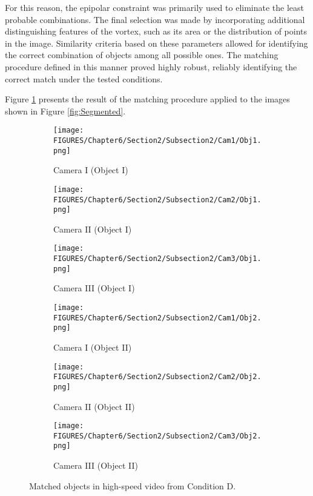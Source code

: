 For this reason, the epipolar constraint was primarily used to eliminate the least probable combinations. The final selection was made by incorporating additional distinguishing features of the vortex, such as its area or the distribution of points in the image. Similarity criteria based on these parameters allowed for identifying the correct combination of objects among all possible ones.
The matching procedure defined in this manner proved highly robust, reliably identifying the correct match under the tested conditions.

Figure \ref{fig:match} presents the result of the matching procedure applied to the images shown in Figure \ref{fig:Segmented}.

\begin{figure}[htbp]
    \centering
    \begin{subfigure}{0.32\textwidth}
        \centering
        \texttt{[image: FIGURES/Chapter6/Section2/Subsection2/Cam1/Obj1.png]}
        \caption{Camera I (Object I)}
    \end{subfigure}
    \begin{subfigure}{0.32\textwidth}
        \centering
        \texttt{[image: FIGURES/Chapter6/Section2/Subsection2/Cam2/Obj1.png]}
        \caption{Camera II (Object I)}
    \end{subfigure}
    \begin{subfigure}{0.32\textwidth}
        \centering
        \texttt{[image: FIGURES/Chapter6/Section2/Subsection2/Cam3/Obj1.png]}
        \caption{Camera III (Object I)}
    \end{subfigure}

    \medskip 
    
    \begin{subfigure}{0.32\textwidth}
        \centering
        \texttt{[image: FIGURES/Chapter6/Section2/Subsection2/Cam1/Obj2.png]}
        \caption{Camera I (Object II)}
    \end{subfigure}
    \begin{subfigure}{0.32\textwidth}
        \centering
        \texttt{[image: FIGURES/Chapter6/Section2/Subsection2/Cam2/Obj2.png]}
        \caption{Camera II (Object II)}
    \end{subfigure}
    \begin{subfigure}{0.32\textwidth}
        \centering
        \texttt{[image: FIGURES/Chapter6/Section2/Subsection2/Cam3/Obj2.png]}
        \caption{Camera III (Object II)}
    \end{subfigure}

    \caption{Matched objects in high-speed video from Condition D.}
    \label{fig:match}
\end{figure}


